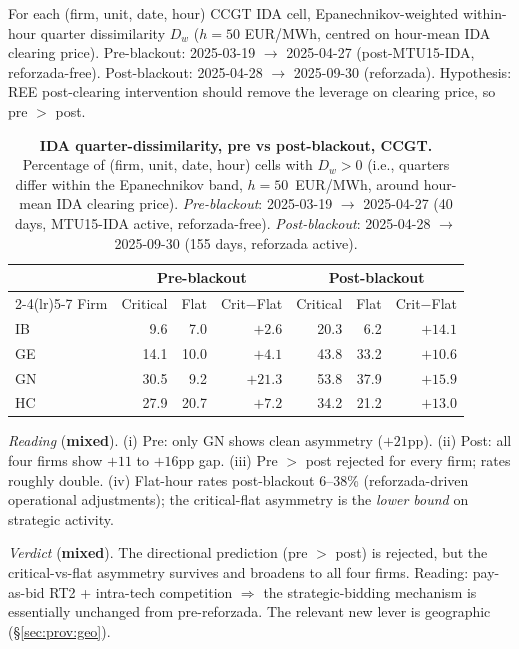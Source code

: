 \documentclass[11pt,a4paper]{article}
\begin{document}
\noindent For each (firm, unit, date, hour) CCGT IDA cell, Epanechnikov-weighted within-hour quarter dissimilarity $D_w$ ($h = 50$ EUR/MWh, centred on hour-mean IDA clearing price). Pre-blackout: 2025-03-19 $\to$ 2025-04-27 (post-MTU15-IDA, reforzada-free). Post-blackout: 2025-04-28 $\to$ 2025-09-30 (reforzada). Hypothesis: REE post-clearing intervention should remove the leverage on clearing price, so pre $>$ post.

\begin{table}[H]
\centering
\caption{\textbf{IDA quarter-dissimilarity, pre vs post-blackout, CCGT.} Percentage of (firm, unit, date, hour) cells with $D_w > 0$ (i.e., quarters differ within the Epanechnikov band, $h = 50$~EUR/MWh, around hour-mean IDA clearing price). \emph{Pre-blackout}: 2025-03-19 $\to$ 2025-04-27 (40 days, MTU15-IDA active, reforzada-free). \emph{Post-blackout}: 2025-04-28 $\to$ 2025-09-30 (155 days, reforzada active).}
\label{tab:ida_pre_post}
\begin{tabular}{l r r r r r r}
\toprule
& \multicolumn{3}{c}{Pre-blackout} & \multicolumn{3}{c}{Post-blackout} \\
\cmidrule(lr){2-4}\cmidrule(lr){5-7}
Firm & Critical & Flat & Crit$-$Flat & Critical & Flat & Crit$-$Flat \\
\midrule
IB &  9.6 &  7.0 & $+2.6$            & 20.3 &  6.2 & $+14.1$ \\
GE & 14.1 & 10.0 & $+4.1$            & 43.8 & 33.2 & $+10.6$ \\
GN & 30.5 &  9.2 & $\mathbf{+21.3}$  & 53.8 & 37.9 & $+15.9$ \\
HC & 27.9 & 20.7 & $+7.2$            & 34.2 & 21.2 & $+13.0$ \\
\bottomrule
\end{tabular}
\end{table}

\textit{Reading} (\textbf{mixed}). (i) Pre: only GN shows clean asymmetry ($+21$pp). (ii) Post: all four firms show $+11$ to $+16$pp gap. (iii) Pre $>$ post rejected for every firm; rates roughly double. (iv) Flat-hour rates post-blackout 6--38\% (reforzada-driven operational adjustments); the critical-flat asymmetry is the \emph{lower bound} on strategic activity.

\textit{Verdict} (\textbf{mixed}). The directional prediction (pre $>$ post) is rejected, but the critical-vs-flat asymmetry survives and broadens to all four firms. Reading: pay-as-bid RT2 + intra-tech competition $\Rightarrow$ the strategic-bidding mechanism is essentially unchanged from pre-reforzada. The relevant new lever is geographic (\S\ref{sec:prov:geo}).
\end{document}
